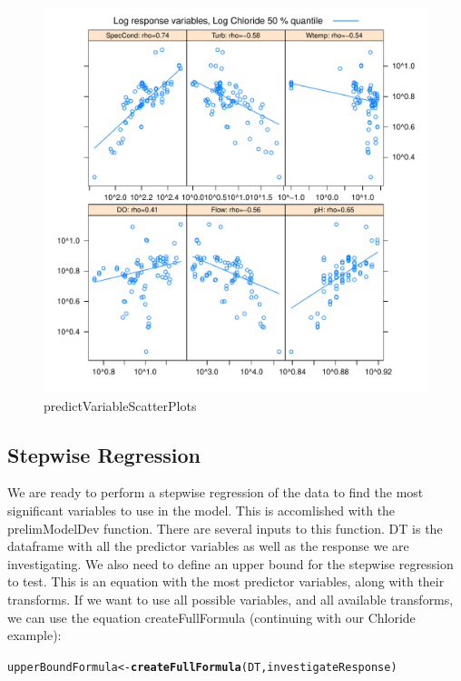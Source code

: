 \documentclass[a4paper,11pt]{article}\usepackage[]{graphicx}\usepackage[]{color}
\makeatletter
\def\maxwidth{ %
  \ifdim\Gin@nat@width>\linewidth
    \linewidth
  \else
    \Gin@nat@width
  \fi
}
\newcommand{\hlstd}[1]{\textcolor[rgb]{0.345,0.345,0.345}{#1}}%
\newcommand{\hlkwb}[1]{\textcolor[rgb]{0.69,0.353,0.396}{#1}}%
\newcommand{\hlkwd}[1]{\textcolor[rgb]{0.737,0.353,0.396}{\textbf{#1}}}%
\newenvironment{kframe}{%
 \def\at@end@of@kframe{}%
 \ifinner\ifhmode%
  \def\at@end@of@kframe{\end{minipage}}%
  \begin{minipage}{\columnwidth}%
 \fi\fi%
 \def\FrameCommand##1{\hskip\@totalleftmargin \hskip-\fboxsep
 \colorbox{shadecolor}{##1}\hskip-\fboxsep
     \hskip-\linewidth \hskip-\@totalleftmargin \hskip\columnwidth}%
 \MakeFramed {\advance\hsize-\width
   \@totalleftmargin\z@ \linewidth\hsize
   \@setminipage}}%
 {\par\unskip\endMakeFramed%
 \at@end@of@kframe}
\newenvironment{knitrout}{}{} %
\makeatother
\begin{document}
\begin{knitrout}
\begin{figure}[]
\includegraphics[width=\maxwidth]{figure/predictVariableScatterPlots2} \caption[predictVariableScatterPlots]{predictVariableScatterPlots\label{fig:predictVariableScatterPlots2}}
\end{figure}


\end{knitrout}


\FloatBarrier
\subsection{Stepwise Regression}
We are ready to perform a stepwise regression of the data to find the most significant variables to use in the model. This is accomlished with the prelimModelDev function. There are several inputs to this function. DT is the dataframe with all the predictor variables as well as the response we are investigating. We also need to define an upper bound for the stepwise regression to test. This is an equation with the most predictor variables, along with their transforms. If we want to use all possible variables, and all available transforms, we can use the equation createFullFormula (continuing with our Chloride example):

\begin{knitrout}
\color{fgcolor}\begin{kframe}
\begin{alltt}
\hlstd{upperBoundFormula} \hlkwb{<-} \hlkwd{createFullFormula}\hlstd{(DT,investigateResponse)}
\end{alltt}
\end{kframe}
\end{knitrout}
\end{document}

